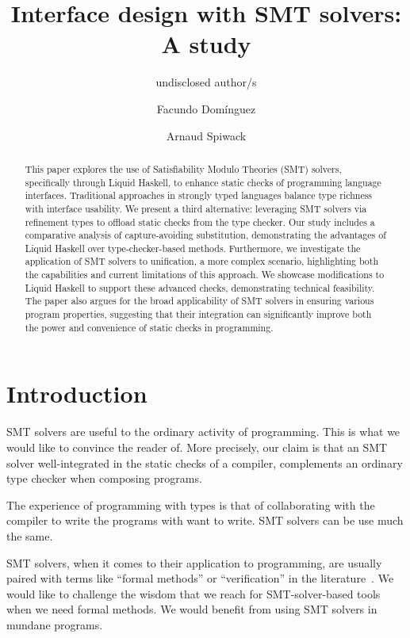 \documentclass[sigconf, anonymous, review]{acmart}
\title{Interface design with SMT solvers: A study}
\author{undisclosed author/s}
\author{Facundo Domínguez}
\affiliation{
     \institution{Tweag}
     \country{Uruguay}
}
\author{Arnaud Spiwack}
\affiliation{
     \institution{Tweag}
     \country{France}
}
\begin{document}
\begin{abstract}
    This paper explores the use of Satisfiability Modulo Theories (SMT) solvers,
    specifically through Liquid Haskell, to enhance static checks of
    programming language interfaces. Traditional approaches in strongly typed
    languages balance type richness with interface usability. We present a
    third alternative: leveraging SMT solvers via refinement types to offload
    static checks from the type checker. Our study includes a comparative
    analysis of capture-avoiding substitution, demonstrating the advantages of
    Liquid Haskell over type-checker-based methods. Furthermore, we investigate
    the application of SMT solvers to unification, a more complex scenario,
    highlighting both the capabilities and current limitations of this
    approach. We showcase modifications to Liquid Haskell to support these
    advanced checks, demonstrating technical feasibility. The paper also
    argues for the broad applicability of SMT solvers in ensuring various
    program properties, suggesting that their integration can significantly
    improve both the power and convenience of static checks in programming.
\end{abstract}
\maketitle

\section{Introduction}

 SMT solvers are useful to the ordinary activity of
programming. This is what we would like to convince the reader of. More
precisely, our claim is that an SMT solver well-integrated in the static checks
of a compiler, complements an ordinary type checker when composing programs.

The experience of programming with types is that of collaborating with the
compiler to write the programs with want to write. SMT solvers can be use much
the same.

SMT solvers, when it comes to their application to programming, are usually
paired with terms like ``formal methods'' or ``verification'' in the
literature~\cite{barnett05,demoura08,zinzin17,swamy22}. We would like to
challenge the wisdom that we reach for SMT-solver-based tools when we need
formal methods. We would benefit from using SMT solvers in mundane programs.
\end{document}
